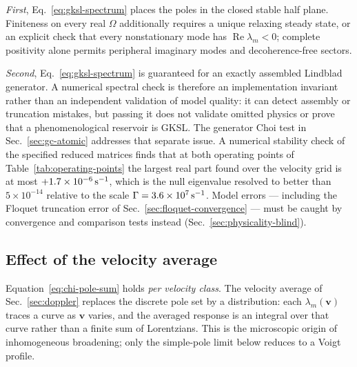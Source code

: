 \documentclass[11pt,a4paper]{article}
\newcommand{\Rea}{\operatorname{Re}}
\begin{document}
\emph{First}, Eq.~\eqref{eq:gksl-spectrum} places the poles in the closed stable
half plane. Finiteness on every real $\Omega$ additionally requires a unique
relaxing steady state, or an explicit check that every nonstationary mode has
$\Rea\lambda_m<0$; complete positivity alone permits peripheral imaginary
modes and decoherence-free sectors.

\emph{Second}, Eq.~\eqref{eq:gksl-spectrum} is guaranteed for an exactly
assembled Lindblad generator. A numerical spectral check is therefore an
implementation invariant rather than an independent validation of model
quality: it can detect assembly or truncation mistakes, but passing it does
not validate omitted physics or prove that a phenomenological reservoir is GKSL.
The generator Choi test in Sec.~\ref{sec:gc-atomic} addresses that separate issue.
A numerical stability check of the specified reduced matrices finds that at
both operating points of Table~\ref{tab:operating-points} the largest real
part found over the velocity grid is at most
$+1.7\times10^{-6}\,{\rm s^{-1}}$, which is the null eigenvalue resolved to
better than $5\times10^{-14}$ relative to the scale
$\Gamma=3.6\times10^{7}\,{\rm s^{-1}}$. Model errors --- including the
Floquet truncation error of Sec.~\ref{sec:floquet-convergence} --- must be
caught by convergence and comparison tests instead
(Sec.~\ref{sec:physicality-blind}).

\subsection{Effect of the velocity average}
\label{sec:pole-doppler}

Equation~\eqref{eq:chi-pole-sum} holds \emph{per velocity class}. The
velocity average of Sec.~\ref{sec:doppler} replaces the discrete pole set by
a distribution: each $\lambda_m(\bm v)$ traces a curve as $\bm v$ varies, and
the averaged response is an integral over that curve rather than a finite sum
of Lorentzians. This is the microscopic origin of inhomogeneous broadening;
only the simple-pole limit below reduces to a Voigt profile.
\end{document}
